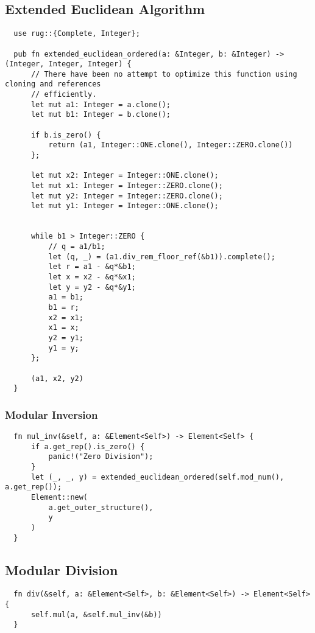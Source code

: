 \subsection{Extended Euclidean Algorithm}
\label{sec:ext-euclid-alg}
\begin{verbatim}
  use rug::{Complete, Integer};

  pub fn extended_euclidean_ordered(a: &Integer, b: &Integer) -> (Integer, Integer, Integer) {
      // There have been no attempt to optimize this function using cloning and references
      // efficiently.
      let mut a1: Integer = a.clone();
      let mut b1: Integer = b.clone();

      if b.is_zero() {
          return (a1, Integer::ONE.clone(), Integer::ZERO.clone())
      };

      let mut x2: Integer = Integer::ONE.clone();
      let mut x1: Integer = Integer::ZERO.clone();
      let mut y2: Integer = Integer::ZERO.clone();
      let mut y1: Integer = Integer::ONE.clone();


      while b1 > Integer::ZERO {
          // q = a1/b1;
          let (q, _) = (a1.div_rem_floor_ref(&b1)).complete();
          let r = a1 - &q*&b1;
          let x = x2 - &q*&x1;
          let y = y2 - &q*&y1;
          a1 = b1;
          b1 = r;
          x2 = x1;
          x1 = x;
          y2 = y1;
          y1 = y;
      };

      (a1, x2, y2)
  }
\end{verbatim}


\subsubsection{Modular Inversion}
\label{sec:Modular Inversion}
\begin{verbatim}
  fn mul_inv(&self, a: &Element<Self>) -> Element<Self> {
      if a.get_rep().is_zero() {
          panic!("Zero Division");
      }
      let (_, _, y) = extended_euclidean_ordered(self.mod_num(), a.get_rep());
      Element::new(
          a.get_outer_structure(),
          y
      )
  }
\end{verbatim}


\subsection{Modular Division}
\label{sub:Modular Division}
\begin{verbatim}
  fn div(&self, a: &Element<Self>, b: &Element<Self>) -> Element<Self> {
      self.mul(a, &self.mul_inv(&b))
  }
\end{verbatim}


